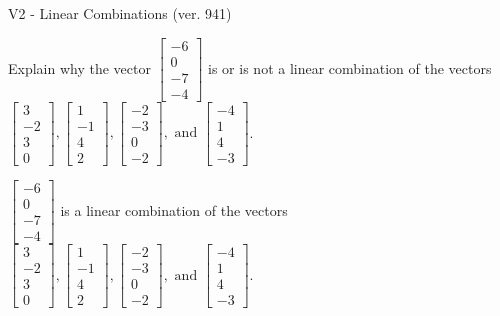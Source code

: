 \begin{exercise}
  \begin{exerciseTitle}V2 - Linear Combinations (ver. 941)\end{exerciseTitle}
  \begin{exerciseStatement}
    Explain why the vector \(\left[\begin{array}{c}
-6 \\
0 \\
-7 \\
-4
\end{array}\right]\)  is or is not a linear 
	combination of the vectors \(\left[\begin{array}{c}
3 \\
-2 \\
3 \\
0
\end{array}\right] , \left[\begin{array}{c}
1 \\
-1 \\
4 \\
2
\end{array}\right] , \left[\begin{array}{c}
-2 \\
-3 \\
0 \\
-2
\end{array}\right] , \text{ and } \left[\begin{array}{c}
-4 \\
1 \\
4 \\
-3
\end{array}\right]\).
	


  \end{exerciseStatement}
  \begin{exerciseAnswer}
   \(\left[\begin{array}{c}
-6 \\
0 \\
-7 \\
-4
\end{array}\right]\) 
  	 is  
	a linear combination of the vectors \(\left[\begin{array}{c}
3 \\
-2 \\
3 \\
0
\end{array}\right] , \left[\begin{array}{c}
1 \\
-1 \\
4 \\
2
\end{array}\right] , \left[\begin{array}{c}
-2 \\
-3 \\
0 \\
-2
\end{array}\right] , \text{ and } \left[\begin{array}{c}
-4 \\
1 \\
4 \\
-3
\end{array}\right]\).


\end{exerciseAnswer}
\end{exercise}
